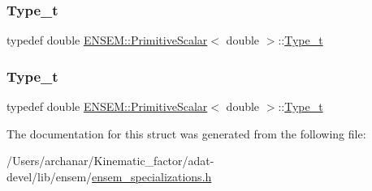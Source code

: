 \mbox{\label{structENSEM_1_1PrimitiveScalar_3_01double_01_4_aa2e1f2e6e01268fb7f088e4f05c58a7f}} 
\subsubsection{\texorpdfstring{Type\_t}{Type\_t}\hspace{0.1cm}{\footnotesize\ttfamily [2/3]}}
{\footnotesize\ttfamily typedef double \mbox{\hyperlink{structENSEM_1_1PrimitiveScalar}{E\+N\+S\+E\+M\+::\+Primitive\+Scalar}}$<$ double $>$\+::\mbox{\hyperlink{structENSEM_1_1PrimitiveScalar_3_01double_01_4_aa2e1f2e6e01268fb7f088e4f05c58a7f}{Type\+\_\+t}}}

\mbox{\label{structENSEM_1_1PrimitiveScalar_3_01double_01_4_aa2e1f2e6e01268fb7f088e4f05c58a7f}} 
\subsubsection{\texorpdfstring{Type\_t}{Type\_t}\hspace{0.1cm}{\footnotesize\ttfamily [3/3]}}
{\footnotesize\ttfamily typedef double \mbox{\hyperlink{structENSEM_1_1PrimitiveScalar}{E\+N\+S\+E\+M\+::\+Primitive\+Scalar}}$<$ double $>$\+::\mbox{\hyperlink{structENSEM_1_1PrimitiveScalar_3_01double_01_4_aa2e1f2e6e01268fb7f088e4f05c58a7f}{Type\+\_\+t}}}



The documentation for this struct was generated from the following file\+:\begin{DoxyCompactItemize}
\item 
/\+Users/archanar/\+Kinematic\+\_\+factor/adat-\/devel/lib/ensem/\mbox{\hyperlink{adat-devel_2lib_2ensem_2ensem__specializations_8h}{ensem\+\_\+specializations.\+h}}\end{DoxyCompactItemize}
